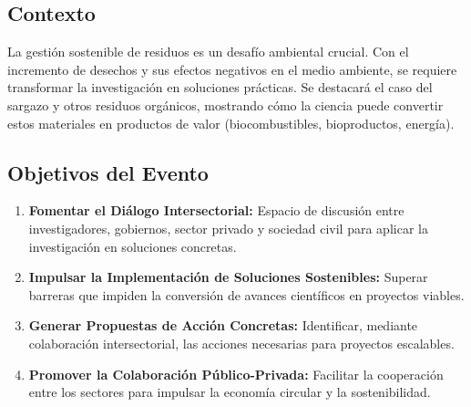 \documentclass[11pt,a4paper]{article}
\begin{document}
\subsection{Contexto}
La gestión sostenible de residuos es un desafío ambiental crucial. Con el incremento de desechos y sus efectos negativos en el medio ambiente, se requiere transformar la investigación en soluciones prácticas. Se destacará el caso del sargazo y otros residuos orgánicos, mostrando cómo la ciencia puede convertir estos materiales en productos de valor (biocombustibles, bioproductos, energía).

\subsection{Objetivos del Evento}
\begin{enumerate}[label=\arabic*.]
    \item \textbf{Fomentar el Diálogo Intersectorial:} Espacio de discusión entre investigadores, gobiernos, sector privado y sociedad civil para aplicar la investigación en soluciones concretas.
    \item \textbf{Impulsar la Implementación de Soluciones Sostenibles:} Superar barreras que impiden la conversión de avances científicos en proyectos viables.
    \item \textbf{Generar Propuestas de Acción Concretas:} Identificar, mediante colaboración intersectorial, las acciones necesarias para proyectos escalables.
    \item \textbf{Promover la Colaboración Público-Privada:} Facilitar la cooperación entre los sectores para impulsar la economía circular y la sostenibilidad.
\end{enumerate}
\end{document}
